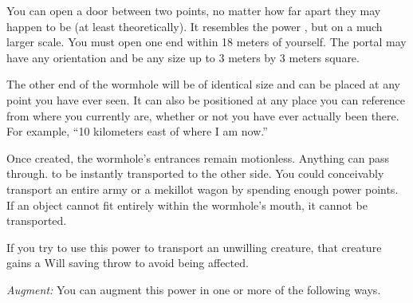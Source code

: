 {
	You can open a door between two points, no matter how far apart they may happen to be (at least theoretically). It resembles the power , but on a much larger scale. You must open one end within 18 meters of yourself. The portal may have any orientation and be any size up to 3 meters by 3 meters square.

	The other end of the wormhole will be of identical size and can be placed at any point you have ever seen. It can also be positioned at any place you can reference from where you currently are, whether or not you have ever actually been there. For example, ``10 kilometers east of where I am now.''

	Once created, the wormhole's entrances remain motionless. Anything can pass through. to be instantly transported to the other side. You could conceivably transport an entire army or a mekillot wagon by spending enough power points. If an object cannot fit entirely within the wormhole's mouth, it cannot be transported.

	If you try to use this power to transport an unwilling creature, that creature gains a Will saving throw to avoid being affected.

	\textit{Augment:} You can augment this power in one or more of the following ways.
}
